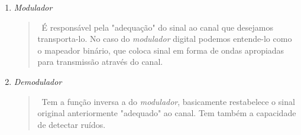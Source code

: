 \documentclass{beamer}
\begin{document}

\begin{frame}

      \begin{enumerate}

	 \item \textit{Modulador} 

	 \begin{quote}

	 \ É responsável pela "adequação" do sinal ao canal que desejamos transporta-lo. No caso do \textit{modulador} digital podemos entende-lo como o mapeador binário, que coloca sinal em forma de ondas apropiadas para transmissão através do canal.

	 \end{quote}

	 \item \textit{Demodulador}

	       \begin{quote}

		  \ Tem a função inversa a do \textit{modulador}, basicamente restabelece o sinal original anteriormente "adequado" ao canal. Tem também a capacidade de detectar ruídos.

	       \end{quote}

      \end{enumerate}

\end{frame}

\end{document}
